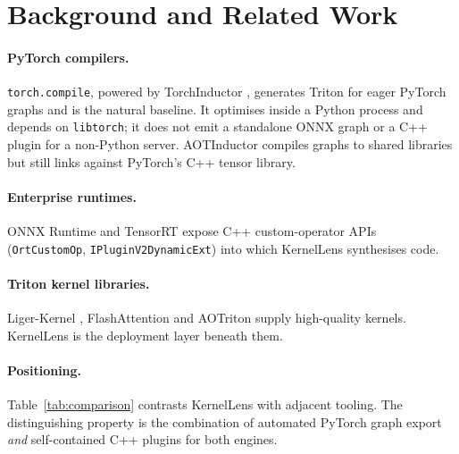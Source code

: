 \documentclass[11pt,a4paper]{article}
\begin{document}
\section{Background and Related Work}

\paragraph{PyTorch compilers.} \texttt{torch.compile}, powered by TorchInductor
\cite{pytorch20}, generates Triton for eager PyTorch graphs and is the natural
baseline. It optimises inside a Python process and depends on \texttt{libtorch};
it does not emit a standalone ONNX graph or a C++ plugin for a non-Python
server. AOTInductor \cite{aotinductor} compiles graphs to shared libraries but
still links against PyTorch's C++ tensor library.

\paragraph{Enterprise runtimes.} ONNX Runtime \cite{onnxruntime} and TensorRT
\cite{tensorrt} expose C++ custom-operator APIs (\texttt{OrtCustomOp},
\texttt{IPluginV2DynamicExt}) into which KernelLens synthesises code.

\paragraph{Triton kernel libraries.} Liger-Kernel \cite{ligerkernel},
FlashAttention \cite{flashattn1,flashattn2} and AOTriton supply high-quality
kernels. KernelLens is the deployment layer beneath them.

\paragraph{Positioning.} Table~\ref{tab:comparison} contrasts KernelLens with
adjacent tooling. The distinguishing property is the combination of automated
PyTorch graph export \emph{and} self-contained C++ plugins for both engines.
\end{document}
